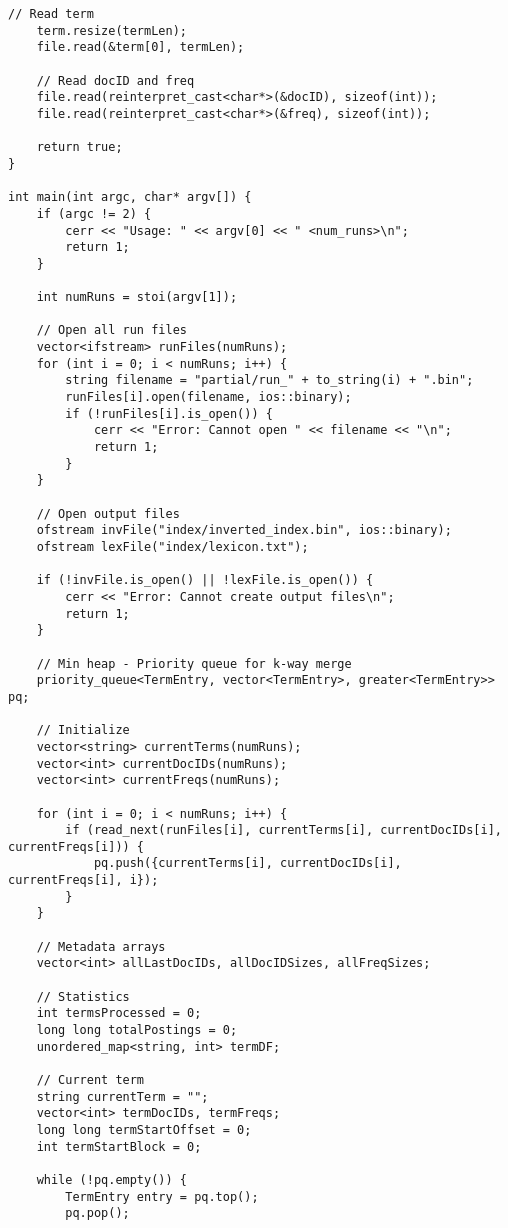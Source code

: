 \documentclass{article}
\begin{document}
\begin{lstlisting}[caption={The complete source code for the merger component.}, label={lst:merger}]
    // Read term
    term.resize(termLen);
    file.read(&term[0], termLen);
    
    // Read docID and freq
    file.read(reinterpret_cast<char*>(&docID), sizeof(int));
    file.read(reinterpret_cast<char*>(&freq), sizeof(int));
    
    return true;
}

int main(int argc, char* argv[]) {
    if (argc != 2) {
        cerr << "Usage: " << argv[0] << " <num_runs>\n";
        return 1;
    }
    
    int numRuns = stoi(argv[1]);
    
    // Open all run files
    vector<ifstream> runFiles(numRuns);
    for (int i = 0; i < numRuns; i++) {
        string filename = "partial/run_" + to_string(i) + ".bin";
        runFiles[i].open(filename, ios::binary);
        if (!runFiles[i].is_open()) {
            cerr << "Error: Cannot open " << filename << "\n";
            return 1;
        }
    }
    
    // Open output files
    ofstream invFile("index/inverted_index.bin", ios::binary);
    ofstream lexFile("index/lexicon.txt");
    
    if (!invFile.is_open() || !lexFile.is_open()) {
        cerr << "Error: Cannot create output files\n";
        return 1;
    }
    
    // Min heap - Priority queue for k-way merge
    priority_queue<TermEntry, vector<TermEntry>, greater<TermEntry>> pq;
    
    // Initialize
    vector<string> currentTerms(numRuns);
    vector<int> currentDocIDs(numRuns);
    vector<int> currentFreqs(numRuns);
    
    for (int i = 0; i < numRuns; i++) {
        if (read_next(runFiles[i], currentTerms[i], currentDocIDs[i], currentFreqs[i])) {
            pq.push({currentTerms[i], currentDocIDs[i], currentFreqs[i], i});
        }
    }
    
    // Metadata arrays
    vector<int> allLastDocIDs, allDocIDSizes, allFreqSizes;
    
    // Statistics
    int termsProcessed = 0;
    long long totalPostings = 0;
    unordered_map<string, int> termDF;
    
    // Current term
    string currentTerm = "";
    vector<int> termDocIDs, termFreqs;
    long long termStartOffset = 0;
    int termStartBlock = 0;
    
    while (!pq.empty()) {
        TermEntry entry = pq.top();
        pq.pop();
        

\end{lstlisting}
\end{document}
